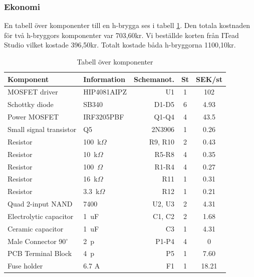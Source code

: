 \subsubsection{Ekonomi}
En tabell över komponenter till en h-brygga ses i tabell \ref{tbl:BOM}. Den totala kostnaden för två h-bryggors komponenter var 703,60kr. Vi beställde korten från ITead Studio vilket kostade 396,50kr. Totalt kostade båda h-bryggorna 1100,10kr.

\begin{table}[htbp!]
\centering
\caption{Tabell över komponenter}
\label{tbl:BOM}
\begin{tabular}{|l|l|r|c|c|}
\hline
\textbf{Komponent} & \textbf{Information} &
\textbf{Schemanot.} & \textbf{St} & \textbf{SEK/st} \\
\hline
MOSFET driver & HIP4081AIPZ & U1 & 1 & 102 \\
\hline
Schottky diode & SB340 & D1-D5 & 6 & 4.93\\
\hline
Power MOSFET & IRF3205PBF & Q1-Q4 & 4 & 43.5\\
\hline
Small signal transistor & Q5 & 2N3906 & 1 & 0.26\\
\hline
Resistor & 100~k$\Omega$ & R9, R10 & 2 & 0.43\\
\hline
Resistor & 10~k$\Omega$ & R5-R8 & 4 & 0.35\\
\hline
Resistor & 100~$\Omega$ & R1-R4 & 4 & 0.27\\
\hline
Resistor & 16~k$\Omega$ & R11 & 1 & 0.31\\
\hline
Resistor & 3.3~k$\Omega$ & R12 & 1 & 0.21\\
\hline
Quad 2-input NAND & 7400 & U2, U3 & 2 & 4.31\\
\hline
Electrolytic capacitor & 1~uF & C1, C2 & 2 & 1.68\\
\hline
Ceramic capacitor & 1~uF & C3 & 1 & 4.31\\
\hline
Male Connector 90$^{\circ}$ & 2~p & P1-P4 & 4 & 0\\
\hline
PCB Terminal Block &  4~p & P5 & 1 & 7.60\\
\hline
Fuse holder & 6.7 A & F1 & 1 & 18.21\\
\hline
\end{tabular}	
\end{table}